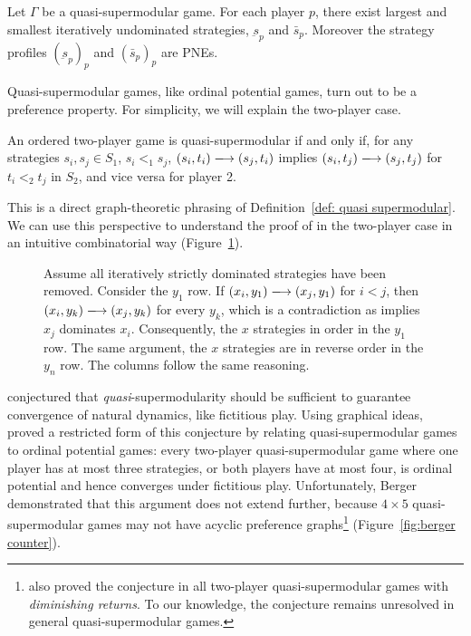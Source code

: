 \documentclass[preprint,authoryear]{elsarticle}
\begin{document}
\begin{thm} \label{QSM theorem}
    Let $\Gamma$ be a quasi-supermodular game. For each player $p$, there exist largest and smallest iteratively undominated strategies, $\underbar{s}_p$ and $\bar{s}_p$. Moreover the strategy profiles $(\underbar{s}_p)_p$ and $(\bar{s}_p)_p$ are PNEs.
\end{thm}

Quasi-supermodular games, like ordinal potential games, turn out to be a preference property. For simplicity, we will explain the two-player case.
\begin{defn}
    An ordered two-player game is quasi-supermodular if and only if, for any strategies $s_i ,s_j\in S_1$, $s_i <_1 s_j$, $\arc{(s_i,t_i)}{(s_j, t_i)}$ implies $\arc{(s_i,t_j)}{(s_j, t_j)}$ for $t_i <_2 t_j$ in $S_2$, and vice versa for player 2.
\end{defn}
This is a direct graph-theoretic phrasing of Definition~\ref{def: quasi supermodular}. We can use this perspective to understand the proof of \cite{milgrom_rationalizability_1990} in the two-player case in an intuitive combinatorial way (Figure~\ref{fig:milgrom and roberts}).
\begin{figure}
    \centering
    
    \caption{Assume all iteratively strictly dominated strategies have been removed. Consider the $y_1$ row. If $\arc{(x_i, y_1)}{(x_j,y_1)}$ for $i<j$, then $\arc{(x_i, y_k)}{(x_j,y_k)}$ for every $y_k$, which is a contradiction as implies $x_j$ dominates $x_i$. Consequently, the $x$ strategies in order in the $y_1$ row. The same argument, the $x$ strategies are in reverse order in the $y_n$ row. The columns follow the same reasoning.}
    \label{fig:milgrom and roberts}
\end{figure}

\cite{milgrom_rationalizability_1990} conjectured that \emph{quasi}-supermodularity should be sufficient to guarantee convergence of natural dynamics, like fictitious play. Using graphical ideas, \cite{berger_two_2007} proved a restricted form of this conjecture by relating quasi-supermodular games to ordinal potential games: every two-player quasi-supermodular game where one player has at most three strategies, or both players have at most four, is ordinal potential and hence converges under fictitious play. Unfortunately, Berger demonstrated that this argument does not extend further, because $4\times 5$ quasi-supermodular games may not have acyclic preference graphs\footnote{\cite{berger_two_2007} also proved the conjecture in all two-player quasi-supermodular games with \emph{diminishing returns}. To our knowledge, the conjecture remains unresolved in general quasi-supermodular games.} (Figure~\ref{fig:berger counter}).
\end{document}
